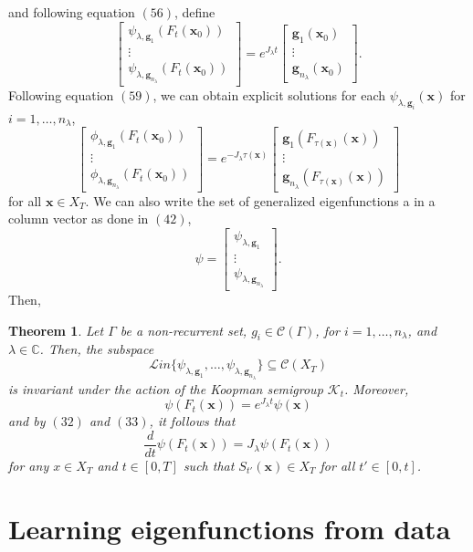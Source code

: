 \documentclass[]{article}
\newtheorem{theorem}{Theorem}
\begin{document}
and following equation $(56)$, define 
\begin{equation}
	\begin{bmatrix}
		\psi_{\lambda,\textbf{g}_1}(F_t(\textbf{x}_0)) \\
		\vdots \\
		\psi_{\lambda,\textbf{g}_{n_{\lambda}}}(F_t(\textbf{x}_0))
	\end{bmatrix} = e^{J_{\lambda}t}
	\begin{bmatrix}
		\textbf{g}_1(\textbf{x}_0) \\
		\vdots \\
		\textbf{g}_{n_{\lambda}}(\textbf{x}_0)
	\end{bmatrix}.
\end{equation}
Following equation $(59)$, we can obtain explicit solutions for each $\psi_{\lambda,\textbf{g}_i}(\textbf{x})$ for $i=1,\dots,n_{\lambda}$,
\begin{equation}
	\begin{bmatrix}
		\phi_{\lambda, \textbf{g}_1}(F_t(\textbf{x}_0)) \\
		\vdots \\
		\phi_{\lambda, \textbf{g}_{n_{\lambda}}}(F_t(\textbf{x}_0))
	\end{bmatrix} = e^{-J_{\lambda} \tau(\textbf{x})}
	\begin{bmatrix}
		\textbf{g}_1(F_{\tau(\textbf{x})}(\textbf{x})) \\
		\vdots \\
		\textbf{g}_{n_{\lambda}}(F_{\tau(\textbf{x})}(\textbf{x}))
	\end{bmatrix}
\end{equation}
for all $\textbf{x} \in X_T$. We can also write the set of generalized eigenfunctions a in a column vector as done in $(42)$,
\begin{equation}
	    \psi = \begin{bmatrix}
		\psi_{\lambda, \textbf{g}_1} \\
		\vdots \\
		\psi_{\lambda, \textbf{g}_{n_{\lambda}}}
	\end{bmatrix}.
\end{equation}
Then,
\begin{theorem}
Let $\Gamma$ be a non-recurrent set, $g_i \in \mathcal{C}(\Gamma)$, for $i=1,\dots,n_{\lambda}$, and $\lambda \in \mathbb{C}$. Then, the subspace 
\begin{equation}
	\mathcal{L}in\{\psi_{\lambda, \textbf{g}_1}, \dots, \psi_{\lambda, \textbf{g}_{n_{\lambda}}}\} \subseteq \mathcal{C}(X_T)
\end{equation}
is invariant under the action of the Koopman semigroup $\mathcal{K}_t$. Moreover,
\begin{equation}
	\psi(F_t(\textbf{x})) = e^{J_{\lambda}t}\psi(\textbf{x})
\end{equation}
and by $(32)$ and $(33)$, it follows that
\begin{equation}
	\frac{d}{dt}\psi(F_t(\textbf{x})) = J_{\lambda}\psi(F_t(\textbf{x}))
\end{equation}
for any $x \in X_T$ and $t \in [0,T]$ such that $S_{t'}(\textbf{x}) \in X_T$ for all $t' \in [0,t]$.
\end{theorem}

\section{Learning eigenfunctions from data}
\end{document}
